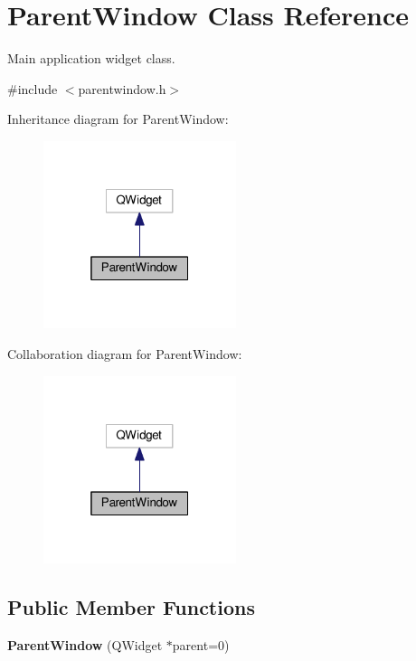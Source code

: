 \hypertarget{class_parent_window}{}\section{Parent\+Window Class Reference}
\label{class_parent_window}


Main application widget class.  




{\ttfamily \#include $<$parentwindow.\+h$>$}



Inheritance diagram for Parent\+Window\+:\nopagebreak
\begin{figure}[H]
\begin{center}
\leavevmode
\includegraphics[width=160pt]{class_parent_window__inherit__graph}
\end{center}
\end{figure}


Collaboration diagram for Parent\+Window\+:\nopagebreak
\begin{figure}[H]
\begin{center}
\leavevmode
\includegraphics[width=160pt]{class_parent_window__coll__graph}
\end{center}
\end{figure}
\subsection*{Public Member Functions}
\begin{DoxyCompactItemize}
\item 
{\bfseries Parent\+Window} (Q\+Widget $\ast$parent=0)\hypertarget{class_parent_window_aa7a1b9030900a9042a59496d6d23c90f}{}\label{class_parent_window_aa7a1b9030900a9042a59496d6d23c90f}

\end{DoxyCompactItemize}



